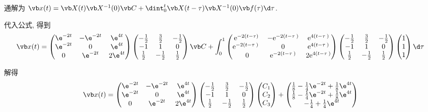 通解为 $\vb x(t)=\vb X(t)\vb X^{-1}(0)\vb C+\dint_{0}^{t}\vb X(t-\tau)\vb X^{-1}(0)\vb f(\tau)\d \tau$.

代入公式, 得到
\[
	\vb x(t)=\begin{pmatrix}\e^{-2t}&-\e^{-2t}&\e^{4t}\\ \e^{-2t}&0&\e^{4t}\\ 0&\e^{-2t}&2\e^{4t}\end{pmatrix}\begin{pmatrix}-\frac{1}{2}&\frac{3}{2}&-\frac{1}{2}\\ -1&1&0\\ \frac{1}{2}&-\frac{1}{2}&\frac{1}{2}\end{pmatrix}\vb C+\int_{0}^{1}\begin{pmatrix}\mathrm{e}^{-2\left(t-\tau \right)}&\mathrm{-e}^{-2\left(t-\tau \:\right)}&\mathrm{e}^{4\left(t-\tau \:\right)}\\ \mathrm{e}^{-2\left(t-\tau \:\right)}\:&0&\mathrm{e}^{4\left(t-\tau \:\right)}\\ \:0&\mathrm{e}^{-2\left(t-\tau \:\right)}&2\mathrm{e}^{4\left(t-\tau \:\right)}\end{pmatrix}\begin{pmatrix}-\frac{1}{2}&\frac{3}{2}&-\frac{1}{2}\\ -1&1&0\\ \frac{1}{2}&-\frac{1}{2}&\frac{1}{2}\end{pmatrix}\begin{pmatrix}1\\ 1\\ 1\end{pmatrix}\d \tau
\]

解得
\[
	\vb x(t)=\begin{pmatrix}\e^{-2t}&-\e^{-2t}&\e^{4t}\\ \e^{-2t}&0&\e^{4t}\\ 0&\e^{-2t}&2\e^{4t}\end{pmatrix}\begin{pmatrix}-\frac{1}{2}&\frac{3}{2}&-\frac{1}{2}\\ -1&1&0\\ \frac{1}{2}&-\frac{1}{2}&\frac{1}{2}\end{pmatrix}\begin{pmatrix}C_1\\ C_2\\ C_3\end{pmatrix}+\begin{pmatrix}\frac{1}{8}-\frac{1}{4}\e^{-2t}+\frac{1}{8}\e^{4t}\\ \frac{1}{8}-\frac{1}{4}\e^{-2t}+\frac{1}{8}\e^{4t}\\ -\frac{1}{4}+\frac{1}{4}\e^{4t}\end{pmatrix}
\]